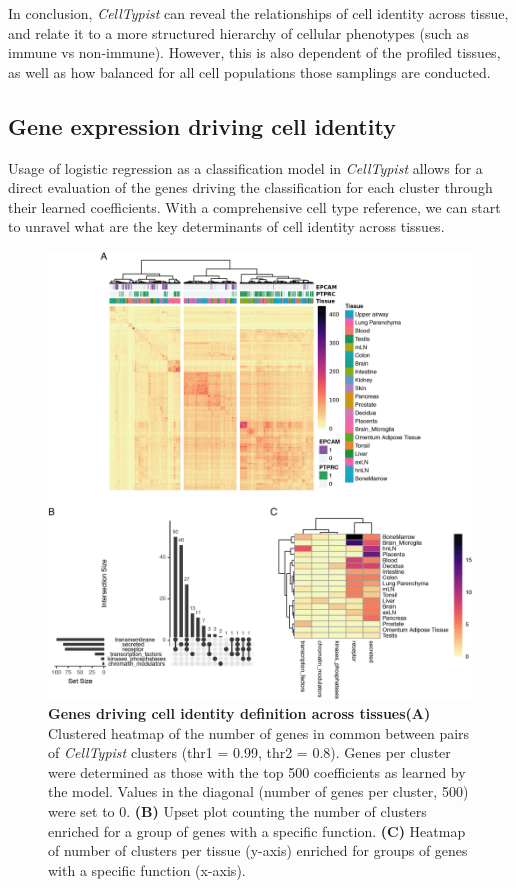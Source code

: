 In conclusion, \textit{CellTypist} can reveal the relationships of cell identity across tissue, and relate it to a more structured hierarchy of cellular phenotypes (such as immune vs non-immune). However, this is also dependent of the profiled tissues, as well as how balanced for all cell populations those samplings are conducted.


\subsection{Gene expression driving cell identity}
\label{section_genes}
Usage of logistic regression as a classification model in \textit{CellTypist} allows for a direct evaluation of the genes driving the classification for each cluster through their learned coefficients. With a comprehensive cell type reference, we can start to unravel what are the key determinants of cell identity across tissues.

\begin{figure}[pht!]
    \centering
    \includegraphics[width=1.0\textwidth]{Chapter4/Figs/chap4_genesAnalysis.png} %
    \caption[Genes driving cell identity definition across tissues]{\textbf{Genes driving cell identity definition across tissues}\newline\textbf{(A)} Clustered heatmap of the number of genes in common between pairs of \textit{CellTypist} clusters (thr1 = 0.99, thr2 = 0.8). Genes per cluster were determined as those with the top 500 coefficients as learned by the model. Values in the diagonal (number of genes per cluster, 500) were set to 0. \textbf{(B)} Upset plot counting the number of clusters enriched for a group of genes with a specific function. \textbf{(C)} Heatmap of number of clusters per tissue (y-axis) enriched for groups of genes with a specific function (x-axis).}
    \label{fig:chap4_genetypes}
\end{figure}

